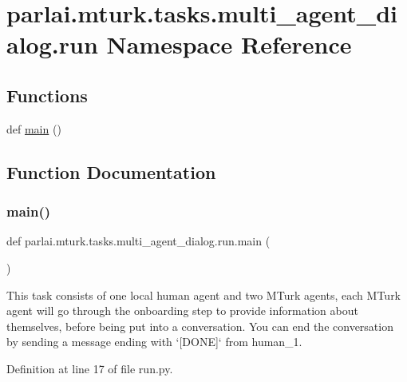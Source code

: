 \hypertarget{namespaceparlai_1_1mturk_1_1tasks_1_1multi__agent__dialog_1_1run}{}\section{parlai.\+mturk.\+tasks.\+multi\+\_\+agent\+\_\+dialog.\+run Namespace Reference}
\label{namespaceparlai_1_1mturk_1_1tasks_1_1multi__agent__dialog_1_1run}
\subsection*{Functions}
\begin{DoxyCompactItemize}
\item 
def \hyperlink{namespaceparlai_1_1mturk_1_1tasks_1_1multi__agent__dialog_1_1run_ab60f6ad04de7f9c7192cdaec99b441d9}{main} ()
\end{DoxyCompactItemize}


\subsection{Function Documentation}
\mbox{\label{namespaceparlai_1_1mturk_1_1tasks_1_1multi__agent__dialog_1_1run_ab60f6ad04de7f9c7192cdaec99b441d9}} 
\subsubsection{\texorpdfstring{main()}{main()}}
{\footnotesize\ttfamily def parlai.\+mturk.\+tasks.\+multi\+\_\+agent\+\_\+dialog.\+run.\+main (\begin{DoxyParamCaption}{ }\end{DoxyParamCaption})}

\begin{DoxyVerb}This task consists of one local human agent and two MTurk agents,
each MTurk agent will go through the onboarding step to provide
information about themselves, before being put into a conversation.
You can end the conversation by sending a message ending with
`[DONE]` from human_1.
\end{DoxyVerb}
 

Definition at line 17 of file run.\+py.

